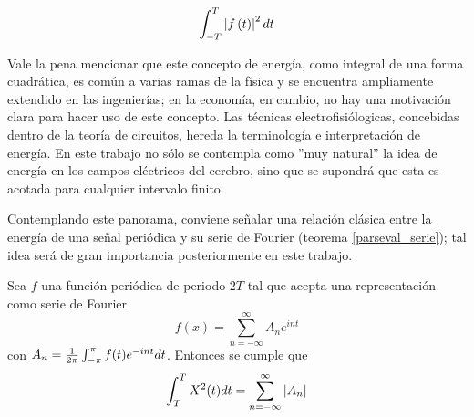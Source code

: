 %

\begin{equation}
\int_{-T}^{T} \left| f\left(t\right) \right|^{2} dt
\label{energia}
\end{equation}

Vale la pena mencionar que este concepto de energ\'ia, como 
integral
de una forma cuadr\'atica, es com\'un a varias ramas de la f\'isica y se encuentra ampliamente
extendido en las ingenier\'ias; en la econom\'ia, en cambio, no hay una motivaci\'on clara para
hacer uso de este concepto. 
Las t\'ecnicas electrofisi\'ologicas, concebidas dentro de la teor\'ia de circuitos, hereda la
terminolog\'ia e interpretaci\'on de energ\'ia.
En
este trabajo no s\'olo se contempla
como ''muy natural'' la idea de energ\'ia en los campos el\'ectricos del cerebro, sino que se
supondr\'a que esta es acotada para cualquier intervalo finito.

Contemplando este panorama, conviene se\~nalar
una relaci\'on cl\'asica entre la energ\'ia de una se\~nal
peri\'odica y su serie de Fourier (teorema \ref{parseval_serie});
tal idea ser\'a de gran importancia posteriormente en este trabajo.  

\begin{defn}
Sea $f$ una funci\'on peri\'odica de periodo $2T$ tal que acepta una representaci\'on como serie
de Fourier
\begin{equation*}
f(x) = \sum_{n=-\infty}^{\infty} A_n e^{i n t}
\end{equation*}
con $A_n = \frac{1}{2\pi} \int_{-\pi}^{\pi} f(t) e^{- i n t} dt$. Entonces se cumple que
\begin{equation*}
\int_T^{T} X^{2}(t) dt = \sum_{n=-\infty}^{\infty} \left| A_n \right|
\end{equation*}
\label{parseval_serie}
\end{defn}

